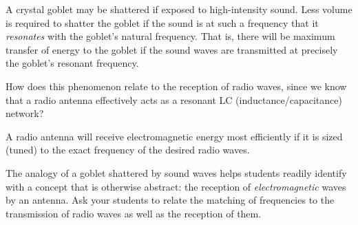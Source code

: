 

A crystal goblet may be shattered if exposed to high-intensity sound.  Less volume is required to shatter the goblet if the sound is at such a frequency that it {\it resonates} with the goblet's natural frequency.  That is, there will be maximum transfer of energy to the goblet if the sound waves are transmitted at precisely the goblet's resonant frequency.

How does this phenomenon relate to the reception of radio waves, since we know that a radio antenna effectively acts as a resonant LC (inductance/capacitance) network?







A radio antenna will receive electromagnetic energy most efficiently if it is sized (tuned) to the exact frequency of the desired radio waves.







The analogy of a goblet shattered by sound waves helps students readily identify with a concept that is otherwise abstract: the reception of {\it electromagnetic} waves by an antenna.  Ask your students to relate the matching of frequencies to the transmission of radio waves as well as the reception of them.




